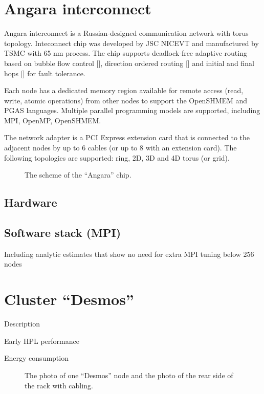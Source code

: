 \documentclass{llncs}
\begin{document}
\section{Angara interconnect}

Angara interconnect is a Russian-designed communication network with torus topology. Inteconnect chip was developed by JSC NICEVT and manufactured by TSMC with 65 nm process. The chip supports deadlock-free adaptive routing based on bubble flow control [],  direction ordered routing [] and initial and final hops [] for fault tolerance.

Each node has a dedicated memory region available for remote access (read, write, atomic operations) from other nodes to support the OpenSHMEM and PGAS languages. Multiple parallel programming models are supported, including MPI, OpenMP, OpenSHMEM.

The network adapter is a PCI Express extension card that is connected to the adjacent nodes by up to 6 cables (or up to 8 with an extension card). The following topologies are supported: ring, 2D, 3D and 4D torus (or grid). 




\begin{figure}
\centering
\caption{The scheme of the ``Angara'' chip.}
\end{figure}

\subsection{Hardware}

\subsection{Software stack (MPI)}

Including analytic estimates that show no need for extra MPI tuning below 256 nodes


\section{Cluster ``Desmos''}

Description

Early HPL performance

Energy consumption

\begin{figure}[h]
\centering
\caption{The photo of one ``Desmos'' node and the photo of the rear side of the rack with cabling.}
\end{figure}
\end{document}
